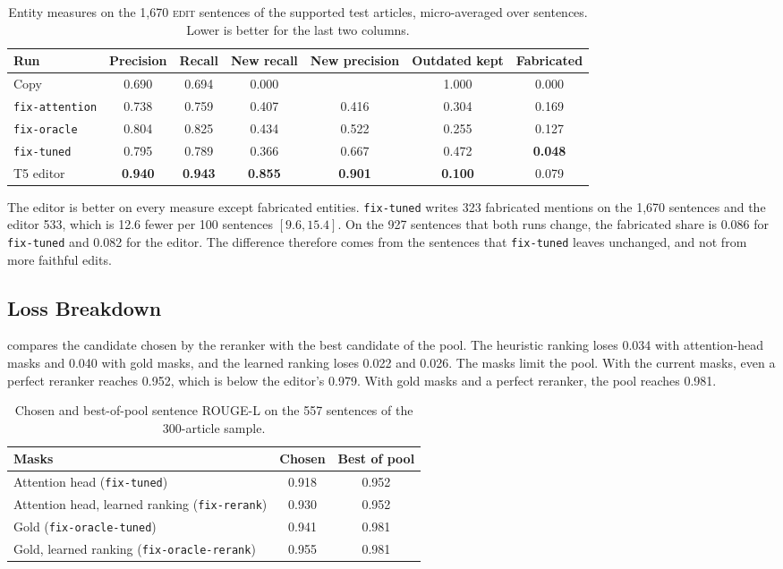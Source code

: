 \documentclass[]{paper}
\newcommand{\edit}{\textsc{edit}}
\newcommand{\run}[1]{\texttt{#1}}
\begin{document}
\begin{table}[H]
\caption{Entity measures on the 1,670 \edit{} sentences of the supported test articles, micro-averaged over sentences. Lower is better for the last two columns.}
\label{tab:entities}
\centering
\footnotesize
\setlength{\tabcolsep}{4pt}
\begin{tabular}{lcccccc}
\toprule
Run & Precision & Recall & New recall & New precision & Outdated kept & Fabricated \\
\midrule
Copy & 0.690 & 0.694 & 0.000 & & 1.000 & 0.000 \\
\run{fix-attention} & 0.738 & 0.759 & 0.407 & 0.416 & 0.304 & 0.169 \\
\run{fix-oracle} & 0.804 & 0.825 & 0.434 & 0.522 & 0.255 & 0.127 \\
\run{fix-tuned} & 0.795 & 0.789 & 0.366 & 0.667 & 0.472 & \textbf{0.048} \\
T5 editor & \textbf{0.940} & \textbf{0.943} & \textbf{0.855} & \textbf{0.901} & \textbf{0.100} & 0.079 \\
\bottomrule
\end{tabular}
\end{table}

The editor is better on every measure except fabricated entities. \run{fix-tuned} writes 323 fabricated mentions on the 1,670 sentences and the editor 533, which is 12.6 fewer per 100 sentences $[9.6, 15.4]$. On the 927 sentences that both runs change, the fabricated share is 0.086 for \run{fix-tuned} and 0.082 for the editor. The difference therefore comes from the sentences that \run{fix-tuned} leaves unchanged, and not from more faithful edits.

\subsection{Loss Breakdown}

 compares the candidate chosen by the reranker with the best candidate of the pool. The heuristic ranking loses 0.034 with attention-head masks and 0.040 with gold masks, and the learned ranking loses 0.022 and 0.026. The masks limit the pool. With the current masks, even a perfect reranker reaches 0.952, which is below the editor's 0.979. With gold masks and a perfect reranker, the pool reaches 0.981.

\begin{table}[H]
\caption{Chosen and best-of-pool sentence ROUGE-L on the 557 sentences of the 300-article sample.}
\label{tab:pool}
\centering
\footnotesize
\begin{tabular}{lcc}
\toprule
Masks & Chosen & Best of pool \\
\midrule
Attention head (\run{fix-tuned}) & 0.918 & 0.952 \\
Attention head, learned ranking (\run{fix-rerank}) & 0.930 & 0.952 \\
Gold (\run{fix-oracle-tuned}) & 0.941 & 0.981 \\
Gold, learned ranking (\run{fix-oracle-rerank}) & 0.955 & 0.981 \\
\bottomrule
\end{tabular}
\end{table}
\end{document}
